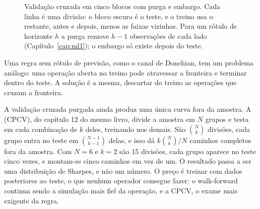 \begin{figure}[t]
\centering
{}
\caption{Validação cruzada em cinco blocos com purga e embargo. Cada linha é uma divisão: o bloco escuro é o teste, e o treino usa o restante, antes e depois, menos as faixas vizinhas. Para um rótulo de horizonte $h$ a purga remove $h-1$ observações de cada lado (Capítulo~\ref{cap:ml1}); o embargo só existe depois do teste.}
\label{fig:c11-purga}
\end{figure}

Uma regra sem rótulo de previsão, como o canal de Donchian, tem um problema análogo: uma operação aberta no treino pode atravessar a fronteira e terminar dentro do teste. A solução é a mesma, descartar do treino as operações que cruzam a fronteira.

A validação cruzada purgada ainda produz uma única curva fora da amostra. A  (CPCV), do capítulo 12 do mesmo livro, divide a amostra em $N$ grupos e testa em cada combinação de $k$ deles, treinando nos demais. São $\binom{N}{k}$ divisões, cada grupo entra no teste em $\binom{N-1}{k-1}$ delas, e isso dá $k\binom{N}{k}/N$ caminhos completos fora da amostra. Com $N = 6$ e $k = 2$ são 15 divisões, cada grupo aparece no teste cinco vezes, e montam-se cinco caminhos em vez de um. O resultado passa a ser uma distribuição de Sharpes, e não um número. O preço é treinar com dados posteriores ao teste, o que nenhum operador consegue fazer: o walk-forward continua sendo a simulação mais fiel da operação, e a CPCV, o exame mais exigente da regra.

